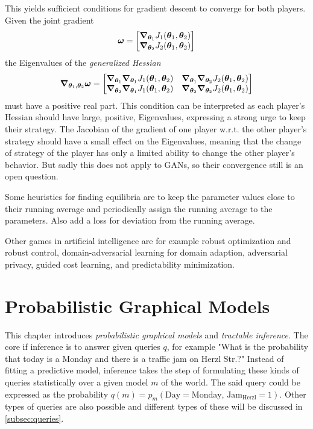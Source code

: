 		This yields sufficient conditions for gradient descent to converge for both players. Given the joint gradient
		\begin{equation}
			\bm{\omega} =
			\begin{bmatrix}
				\grad_{\bm{\theta}_1} J_1(\bm{\theta}_1, \bm{\theta}_2) \\
				\grad_{\bm{\theta}_2} J_2(\bm{\theta}_1, \bm{\theta}_2)
			\end{bmatrix}
		\end{equation}
		the Eigenvalues of the \emph{generalized Hessian}
		\begin{equation}
			\grad_{\bm{\theta}_1, \bm{\theta}_2} \bm{\omega} =
			\begin{bmatrix}
				\grad_{\bm{\theta}_1} \grad_{\bm{\theta}_1} J_1(\bm{\theta}_1, \bm{\theta}_2) & \grad_{\bm{\theta}_1} \grad_{\bm{\theta}_2} J_2(\bm{\theta}_1, \bm{\theta}_2) \\
				\grad_{\bm{\theta}_2} \grad_{\bm{\theta}_1} J_1(\bm{\theta}_1, \bm{\theta}_2) & \grad_{\bm{\theta}_2} \grad_{\bm{\theta}_2} J_2(\bm{\theta}_1, \bm{\theta}_2)
			\end{bmatrix}
		\end{equation}
		must have a positive real part. This condition can be interpreted as each player's Hessian should have large, positive, Eigenvalues, expressing a strong urge to keep their strategy. The Jacobian of the gradient of one player w.r.t. the other player's strategy should have a small effect on the Eigenvalues, meaning that the change of strategy of the player has only a limited ability to change the other player's behavior. But sadly this does not apply to GANs, so their convergence still is an open question.

		Some heuristics for finding equilibria are to keep the parameter values close to their running average and periodically assign the running average to the parameters. Also add a loss for deviation from the running average.

		Other games in artificial intelligence are for example robust optimization and robust control, domain-adversarial learning for domain adaption, adversarial privacy, guided cost learning, and predictability minimization.

\chapter{Probabilistic Graphical Models}
	This chapter introduces \emph{probabilistic graphical models} and \emph{tractable inference}. The core if inference is to answer given queries \(q\), for example "What is the probability that today is a Monday and there is a traffic jam on Herzl Str.?" Instead of fitting a predictive model, inference takes the step of formulating these kinds of queries statistically over a given model \(m\) of the world. The said query could be expressed as the probability \( q(m) = p_{m}(\text{Day} = \text{Monday},\, \text{Jam}_\text{Herzl} = 1) \). Other types of queries are also possible and different types of these will be discussed in \autoref{subsec:queries}.

